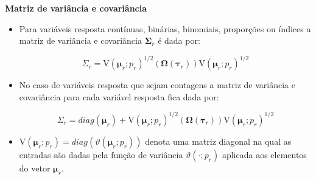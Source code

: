 \documentclass[10pt,
  aspectratio=169,
  serif,
  mathserif,
  professionalfont,
  compress,
  handout,
  ]{beamer}\usepackage[]{graphicx}\usepackage[]{color}
\begin{document}
\begin{frame}[c, allowframebreaks]

\textbf{Matriz de variância e covariância}

\begin{itemize}

  \item Para variáveis resposta contínuas, binárias, binomiais, proporções ou índices a matriz de variância e covariância $\boldsymbol{\Sigma}_r$ é dada por:
  
$$
\Sigma_r = \mathrm{V}\left(\boldsymbol{\mu}_r; p_r\right)^{1/2}(\boldsymbol{\Omega}\left(\boldsymbol{\tau}_r\right))\mathrm{V}\left(\boldsymbol{\mu}_r; p_r\right)^{1/2}
$$

  \item No caso de variáveis resposta que sejam contagens a matriz de variância e covariância para cada variável resposta fica dada por:

$$
\Sigma_r = diag(\boldsymbol{\mu}_r)+ \mathrm{V}\left(\boldsymbol{\mu}_r; p_r\right)^{1/2}(\boldsymbol{\Omega}\left(\boldsymbol{\tau}_r\right))\mathrm{V}\left(\boldsymbol{\mu}_r; p_r\right)^{1/2}
$$

  \item $\mathrm{V}\left(\boldsymbol{\mu}_r; p_r\right) = diag(\vartheta(\boldsymbol{\mu}_r; p_r))$ denota uma matriz diagonal na qual as entradas são dadas pela função de variância $\vartheta(\cdot; p_r)$ aplicada aos elementos do vetor $\boldsymbol{\mu}_r$.
  
\end{itemize}

\end{frame}

\end{document}
